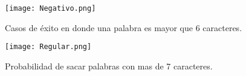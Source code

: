 \documentclass[]{article}
\begin{document}
\begin{figure}[b]
    \centering
    \texttt{[image: Negativo.png]}    \caption{Casos de éxito en donde una palabra es mayor que 6 caracteres.}
    \label{fig:Negativo}
\end{figure}
\begin{figure}[b]
    \centering
    \texttt{[image: Regular.png]}    \caption{Probabilidad de sacar palabras con mas de 7 caracteres.}
    \label{fig:Regular}
\end{figure}


\printbibliography[title={Referencias}]
\end{document}

